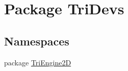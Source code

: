 \hypertarget{namespace_tri_devs}{\section{Package Tri\-Devs}
\label{namespace_tri_devs}
}
\subsection*{Namespaces}
\begin{DoxyCompactItemize}
\item 
package \hyperlink{namespace_tri_devs_1_1_tri_engine2_d}{Tri\-Engine2\-D}
\end{DoxyCompactItemize}
